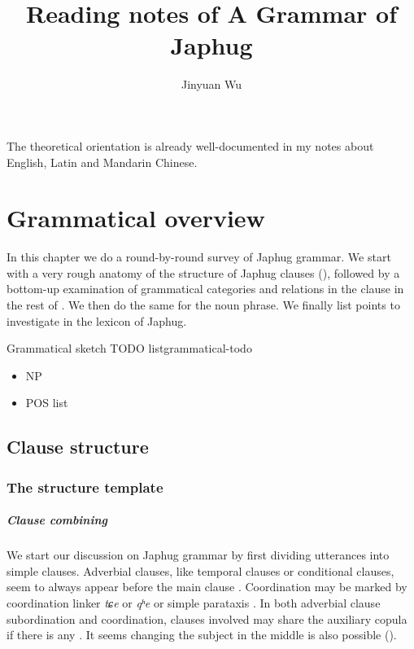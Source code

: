 \documentclass[a4paper, oneside, 12pt]{report}
\title{Reading notes of A Grammar of Japhug}
\author{Jinyuan Wu}
\newcommand*{\citesec}[1]{\S~{#1}}
\newcommand*{\citechap}[1]{Ch~{#1}}
\newcommand*{\citepage}[1]{p.~{#1}}
\newcommand{\form}[1]{\emph{#1}}
\begin{document}
\maketitle

The theoretical orientation is already well-documented in my notes about English, Latin and Mandarin Chinese.

\chapter{Grammatical overview}

In this chapter we do a round-by-round survey of Japhug grammar.
We start with a very rough anatomy of the structure of Japhug clauses
(),
followed by a bottom-up examination of grammatical categories and relations in the clause
in the rest of .
We then do the same for the noun phrase.
We finally list points to investigate in the lexicon of Japhug.

\begin{todobox}{Grammatical sketch TODO list}{grammatical-todo}
    \begin{itemize}
        \item NP
        \item POS list
    \end{itemize}
\end{todobox}

\section{Clause structure}\label{sec:grammatical.clause}

\subsection{The structure template}\label{sec:grammatical.clause.template}

\paragraph*{Clause combining}
We start our discussion on Japhug grammar 
by first dividing utterances into simple clauses.
Adverbial clauses, like temporal clauses or conditional clauses,
seem to always appear before the main clause \citep[\citechap{25}]{jacques2021grammar}.
Coordination may be marked by coordination linker \form{tɕe} or \form{qʰe} or simple parataxis
\citep[\citesec{25.1.6}]{jacques2021grammar}.
In both adverbial clause subordination and coordination,
clauses involved may share the auxiliary copula if there is any
\citep[\citepage{47}, (40); \citepage{1091}, (10)]{jacques2021grammar}.
It seems changing the subject in the middle is also possible
().
\end{document}

